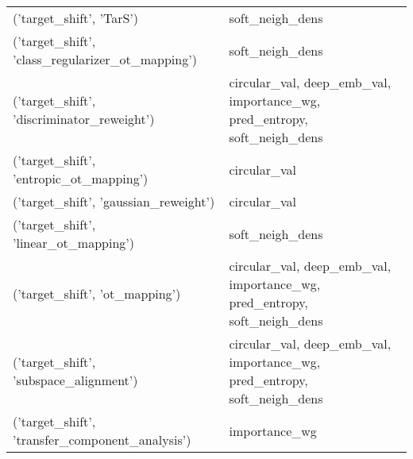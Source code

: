 \begin{tabular}{ll}
 ('target\_shift', 'TarS')                            & soft\_neigh\_dens                                                          \\
 ('target\_shift', 'class\_regularizer\_ot\_mapping')    & soft\_neigh\_dens                                                          \\
 ('target\_shift', 'discriminator\_reweight')          & circular\_val, deep\_emb\_val, importance\_wg, pred\_entropy, soft\_neigh\_dens \\
 ('target\_shift', 'entropic\_ot\_mapping')             & circular\_val                                                             \\
 ('target\_shift', 'gaussian\_reweight')               & circular\_val                                                             \\
 ('target\_shift', 'linear\_ot\_mapping')               & soft\_neigh\_dens                                                          \\
 ('target\_shift', 'ot\_mapping')                      & circular\_val, deep\_emb\_val, importance\_wg, pred\_entropy, soft\_neigh\_dens \\
 ('target\_shift', 'subspace\_alignment')              & circular\_val, deep\_emb\_val, importance\_wg, pred\_entropy, soft\_neigh\_dens \\
 ('target\_shift', 'transfer\_component\_analysis')     & importance\_wg                                                            \\
\hline
\end{tabular}

